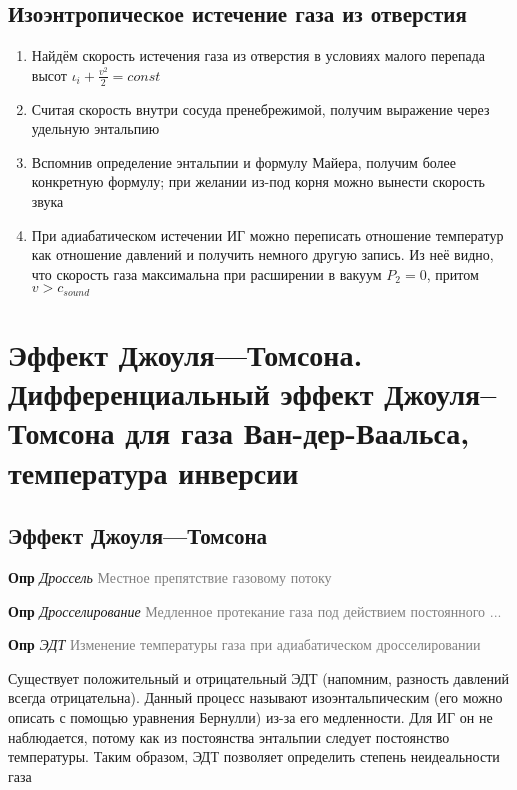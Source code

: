 \documentclass[a4paper, 14pt]{article}
\begin{document}
    \subsection{Изоэнтропическое истечение газа из отверстия}
    
    \begin{enumerate}
        \item Найдём скорость истечения газа из отверстия в условиях малого перепада высот $\iota_i + \frac{v^2}{2} = const$
        \item Считая скорость внутри сосуда пренебрежимой, получим выражение через удельную энтальпию
        \item Вспомнив определение энтальпии и формулу Майера, получим более конкретную формулу; при желании из-под
        корня можно вынести скорость звука
        \item При адиабатическом истечении ИГ можно переписать отношение температур как отношение давлений и получить
        немного другую запись.
        Из неё видно, что скорость газа максимальна при расширении в вакуум $P_2 = 0$, притом $v > c_{sound}$
    \end{enumerate}
    
    \section{Эффект Джоуля—Томсона.
    Дифференциальный эффект Джоуля–Томсона для газа Ван-дер-Ваальса, температура инверсии}
    
    \subsection{Эффект Джоуля—Томсона}
    
    \textbf{Опр} \textit{Дроссель} \textcolor{gray}{Местное препятствие газовому потоку}
    
    \textbf{Опр} \textit{Дросселирование} \textcolor{gray}{Медленное протекание газа под действием постоянного ...}
    
    \textbf{Опр} \textit{ЭДТ} \textcolor{gray}{Изменение температуры газа при адиабатическом дросселировании}
    
    Существует положительный и отрицательный ЭДТ (напомним, разность давлений всегда отрицательна).
    Данный процесс называют изоэнтальпическим (его можно описать с помощью уравнения Бернулли) из-за его медленности.
    Для ИГ он не наблюдается, потому как из постоянства энтальпии следует постоянство температуры.
    Таким образом, ЭДТ позволяет определить степень неидеальности газа
    
\end{document}

